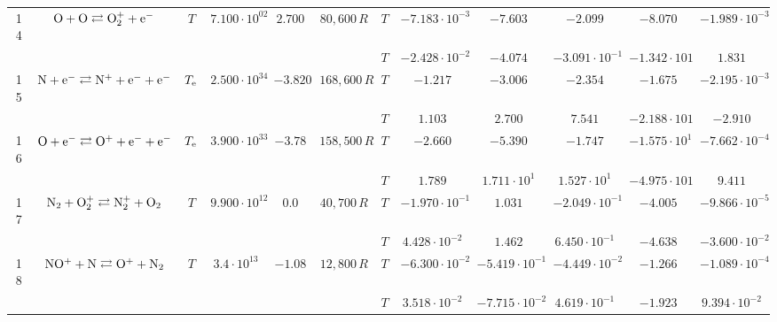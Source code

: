 \documentclass{warpdoc}
\begin{document}
\begin{table}[!ht]
\begin{center}
\begin{threeparttable}
\begin{tabular}{cccccccccccc}
                                          
14 & $\rm O + O \rightleftarrows O_2^{+}+e^-$ &$T$ & $7.100 \cdot 10^{02}$ & $2.700$ & $80,600\, R$ 
                                          &$T$  & $-7.183 \cdot 10^{-3}$  & $-7.603$  & $-2.099$ & $-8.070$ & $-1.989 \cdot 10^{-3}$\\
 & & & & &                                &$T$  & $-2.428 \cdot 10^{-2}$  & $-4.074$  & $-3.091 \cdot 10^{-1}$ & $-1.342 \cdot 10{1}$ & $1.831$\\
 
                                          
15 & $\rm N + e^- \rightleftarrows N^{+}+e^{-}+e^{-}$ &$T_{\rm e}$ & $2.500 \cdot 10^{34}$ & $-3.820$ & $168,600 \, R$ 
                                          &$T$  & $-1.217$  & $-3.006$  & $-2.354$ & $-1.675$ & $-2.195 \cdot 10^{-3}$\\
 & & & & &                                &$T$  & $1.103$  & $2.700$  & $7.541$ & $-2.188 \cdot 10{1}$ & $-2.910$\\
 
                                          
16 & $\rm O + e^- \rightleftarrows O^{+}+e^{-}+e^{-}$ &$T_{\rm e}$ & $3.900 \cdot 10^{33}$ & $-3.78$ & $158,500\, R$ 
                                          &$T$  & $-2.660$  & $-5.390$  & $-1.747$ & $-1.575 \cdot 10^{1}$ & $-7.662 \cdot 10^{-4}$\\
 & & & & &                                &$T$  & $1.789$  & $1.711 \cdot 10^{1}$  & $1.527 \cdot 10^{1}$ & $-4.975 \cdot 10{1}$ & $9.411$\\
 
                                          
17 & $\rm N_2 + O_2^+ \rightleftarrows N_2^+ + O_2 $ &$T$ & $9.900 \cdot 10^{12}$ & $0.0$ & $40,700\, R$ 
                                          &$T$  & $-1.970 \cdot 10^{-1}$  & $1.031$  & $-2.049 \cdot 10^{-1}$ & $-4.005$ & $-9.866 \cdot 10^{-5}$\\
 & & & & &                                &$T$  & $4.428 \cdot 10^{-2}$  & $1.462$  & $6.450 \cdot 10^{-1}$ & $-4.638$ & $-3.600 \cdot 10^{-2}$\\
 
                                         
18 & $\rm NO^+ + N \rightleftarrows O^+ + N_2 $ &$T$ & $3.4 \cdot 10^{13}$ & $-1.08$ & $12,800\, R$ 
                                          &$T$  & $-6.300 \cdot 10^{-2}$  & $-5.419 \cdot 10^{-1}$  & $-4.449 \cdot 10^{-2}$ & $-1.266$ & $-1.089 \cdot 10^{-4}$\\
 & & & & &                                &$T$  & $3.518 \cdot 10^{-2}$  & $-7.715 \cdot 10^{-2}$  & $4.619 \cdot 10^{-1}$ & $-1.923$ & $9.394 \cdot 10^{-2}$\\
 

\end{tabular}
\end{threeparttable}
\end{center}
\end{table}
\end{document}
